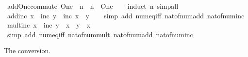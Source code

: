 \begin{isabellebody}
{\isafoldproof}%
%
\isadelimproof
\isanewline
%
\endisadelimproof
\isanewline
{}\isamarkupfalse%
\ add{\isacharunderscore}{\kern0pt}One{\isacharunderscore}{\kern0pt}commute{\isacharcolon}{\kern0pt}\ {\isachardoublequoteopen}One\ {\isacharplus}{\kern0pt}\ n\ {\isacharequal}{\kern0pt}\ n\ {\isacharplus}{\kern0pt}\ One{\isachardoublequoteclose}\isanewline
%
\isadelimproof
\ \ %
\endisadelimproof
%
\isatagproof
{}\isamarkupfalse%
\ {\isacharparenleft}{\kern0pt}induct\ n{\isacharparenright}{\kern0pt}\ simp{\isacharunderscore}{\kern0pt}all%
\endisatagproof
{\isafoldproof}%
%
\isadelimproof
\isanewline
%
\endisadelimproof
\isanewline
{}\isamarkupfalse%
\ add{\isacharunderscore}{\kern0pt}inc{\isacharcolon}{\kern0pt}\ {\isachardoublequoteopen}x\ {\isacharplus}{\kern0pt}\ inc\ y\ {\isacharequal}{\kern0pt}\ inc\ {\isacharparenleft}{\kern0pt}x\ {\isacharplus}{\kern0pt}\ y{\isacharparenright}{\kern0pt}{\isachardoublequoteclose}\isanewline
%
\isadelimproof
\ \ %
\endisadelimproof
%
\isatagproof
{}\isamarkupfalse%
\ {\isacharparenleft}{\kern0pt}simp\ add{\isacharcolon}{\kern0pt}\ num{\isacharunderscore}{\kern0pt}eq{\isacharunderscore}{\kern0pt}iff\ nat{\isacharunderscore}{\kern0pt}of{\isacharunderscore}{\kern0pt}num{\isacharunderscore}{\kern0pt}add\ nat{\isacharunderscore}{\kern0pt}of{\isacharunderscore}{\kern0pt}num{\isacharunderscore}{\kern0pt}inc{\isacharparenright}{\kern0pt}%
\endisatagproof
{\isafoldproof}%
%
\isadelimproof
\isanewline
%
\endisadelimproof
\isanewline
{}\isamarkupfalse%
\ mult{\isacharunderscore}{\kern0pt}inc{\isacharcolon}{\kern0pt}\ {\isachardoublequoteopen}x\ {\isacharasterisk}{\kern0pt}\ inc\ y\ {\isacharequal}{\kern0pt}\ x\ {\isacharasterisk}{\kern0pt}\ y\ {\isacharplus}{\kern0pt}\ x{\isachardoublequoteclose}\isanewline
%
\isadelimproof
\ \ %
\endisadelimproof
%
\isatagproof
{}\isamarkupfalse%
\ {\isacharparenleft}{\kern0pt}simp\ add{\isacharcolon}{\kern0pt}\ num{\isacharunderscore}{\kern0pt}eq{\isacharunderscore}{\kern0pt}iff\ nat{\isacharunderscore}{\kern0pt}of{\isacharunderscore}{\kern0pt}num{\isacharunderscore}{\kern0pt}mult\ nat{\isacharunderscore}{\kern0pt}of{\isacharunderscore}{\kern0pt}num{\isacharunderscore}{\kern0pt}add\ nat{\isacharunderscore}{\kern0pt}of{\isacharunderscore}{\kern0pt}num{\isacharunderscore}{\kern0pt}inc{\isacharparenright}{\kern0pt}%
\endisatagproof
{\isafoldproof}%
%
\isadelimproof
%
\endisadelimproof
%
\begin{isamarkuptext}%
The  conversion.%

\end{isamarkuptext}
\end{isabellebody}

